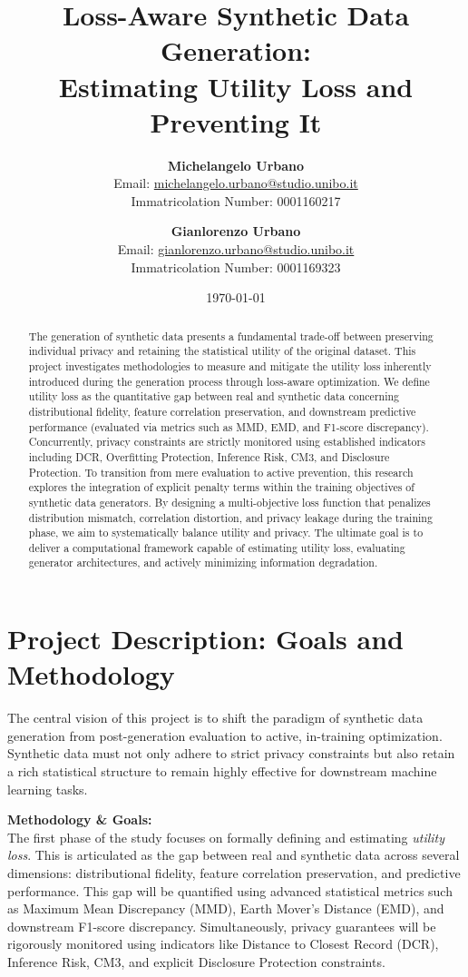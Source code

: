 \documentclass[11pt, a4paper]{article}
\title{\vspace{-1.5cm}\textbf{Loss-Aware Synthetic Data Generation:\\Estimating Utility Loss and Preventing It}\vspace{0.5cm}}
\author{
    \textbf{Michelangelo Urbano} \\
    Email: \href{mailto:michelangelo.urbano@studio.unibo.it}{michelangelo.urbano@studio.unibo.it} \\
    Immatricolation Number: 0001160217
    \and
    \textbf{Gianlorenzo Urbano} \\
    Email: \href{mailto:gianlorenzo.urbano@studio.unibo.it}{gianlorenzo.urbano@studio.unibo.it} \\
    Immatricolation Number: 0001169323
}
\date{\today}
\begin{document}
\maketitle

\renewcommand{\abstractname}{\large Abstract}
\begin{abstract}
\noindent The generation of synthetic data presents a fundamental trade-off between preserving individual privacy and retaining the statistical utility of the original dataset. This project investigates methodologies to measure and mitigate the utility loss inherently introduced during the generation process through loss-aware optimization. We define utility loss as the quantitative gap between real and synthetic data concerning distributional fidelity, feature correlation preservation, and downstream predictive performance (evaluated via metrics such as MMD, EMD, and F1-score discrepancy). Concurrently, privacy constraints are strictly monitored using established indicators including DCR, Overfitting Protection, Inference Risk, CM3, and Disclosure Protection. To transition from mere evaluation to active prevention, this research explores the integration of explicit penalty terms within the training objectives of synthetic data generators. By designing a multi-objective loss function that penalizes distribution mismatch, correlation distortion, and privacy leakage during the training phase, we aim to systematically balance utility and privacy. The ultimate goal is to deliver a computational framework capable of estimating utility loss, evaluating generator architectures, and actively minimizing information degradation.
\end{abstract}

\vspace{0.5cm}

\section*{Project Description: Goals and Methodology}
The central vision of this project is to shift the paradigm of synthetic data generation from post-generation evaluation to active, in-training optimization. Synthetic data must not only adhere to strict privacy constraints but also retain a rich statistical structure to remain highly effective for downstream machine learning tasks. 

\textbf{Methodology \& Goals:}\\
The first phase of the study focuses on formally defining and estimating \textit{utility loss}. This is articulated as the gap between real and synthetic data across several dimensions: distributional fidelity, feature correlation preservation, and predictive performance. This gap will be quantified using advanced statistical metrics such as Maximum Mean Discrepancy (MMD), Earth Mover's Distance (EMD), and downstream F1-score discrepancy. Simultaneously, privacy guarantees will be rigorously monitored using indicators like Distance to Closest Record (DCR), Inference Risk, CM3, and explicit Disclosure Protection constraints.
\end{document}
